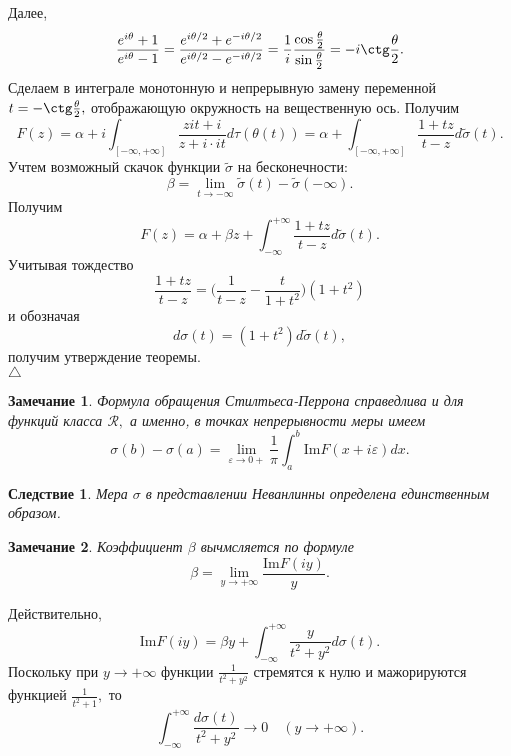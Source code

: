 \documentclass[12pt,a4paper]{article}
\theoremstyle{plain}   \newtheorem{Pro}{Задача}
\newtheorem{Rem}{Замечание}
\newtheorem{Cor}{Следствие}
\begin{document}
Далее,
$$
  \frac{e^{i\theta}+1}{e^{i\theta}-1}=
  \frac{e^{i\theta /2}+e^{-i\theta /2}}
  {e^{i\theta /2}-e^{-i\theta /2}}=
  \frac{1}{i}\frac{\cos \frac{\theta}{2}}
  {\sin \frac{\theta}{2}}=
  -i\ctg \frac{\theta}{2}.
$$
Сделаем в интеграле монотонную и непрерывную замену переменной
$ t=-\ctg \frac{\theta}{2} , $
отображающую окружность на вещественную ось. Получим
$$
  F(z)=\alpha +i \int _{[-\infty , +\infty ]}
  \frac{zit+i}{z+i \cdot it}d\tau (\theta (t))=
  \alpha +\int _{[-\infty , +\infty ]}
  \frac{1+tz}{t-z}d \tilde \sigma (t).
$$
Учтем возможный скачок функции
$ \tilde \sigma $
на бесконечности:
$$
  \beta = \lim _{t \rightarrow -\infty}
  \tilde \sigma (t) - \tilde \sigma (-\infty ).
$$
Получим
$$
  F(z)=\alpha +\beta z + \int _{-\infty}^{+\infty}
  \frac{1+tz}{t-z} d \tilde \sigma (t).
$$
Учитывая тождество
$$
  \frac{1+tz}{t-z}=
  \biggl ( \frac{1}{t-z}-\frac{t}{1+t^2} \biggr )
  (1+t^2 )
$$
и обозначая
$$
  d \sigma (t)=(1+t^2 )d \tilde \sigma (t),
$$
получим утверждение теоремы.
\\
$ \triangle $
\begin{Rem}
Формула обращения Стилтьеса-Перрона справедлива и для функций класса
$ \mathcal{R} , $
а именно, в точках непрерывности меры имеем
$$
  \sigma (b)-\sigma (a)=\lim _{\varepsilon \rightarrow 0+}
  \frac{1}{\pi}\int _a ^b \mathrm{Im} F(x+i \varepsilon )dx.
$$
\end{Rem}
\begin{Cor}
Мера
$ \sigma $
в представлении Неванлинны определена единственным образом.
\end{Cor}
\begin{Rem}
Коэффициент
$ \beta $
вычмсляется по формуле
$$
  \beta = \lim _{y \rightarrow +\infty}
  \frac{\mathrm{Im} F(iy)}{y}.
$$
\end{Rem}
Действительно,
$$
  \mathrm{Im} F(iy) = \beta y + \int _{-\infty}^{+\infty}
  \frac{y}{t^2 +y^2}d \sigma (t).
$$
Поскольку при
$ y \rightarrow +\infty $
функции
$ \frac{1}{t^2 +y^2} $
стремятся к нулю и мажорируются функцией
$ \frac{1}{t^2 +1}, $
то
$$
  \int _{-\infty}^{+\infty}
  \frac{d\sigma (t)}{t^2 +y^2} \rightarrow 0
  \quad (y \rightarrow +\infty ).
$$
\\
\end{document}
